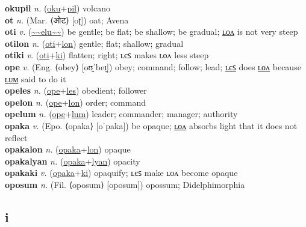\textbf{okupil} \textit{n.} (\hyperref[oku]{oku}+\hyperref[pil]{pil})
volcano \label{okupil} \\
\textbf{ot} \textit{n.} (Mar. ⟨ओट⟩ [oʈ])
oat; Avena \label{ot} \\
\textbf{oti} \textit{v.} (\hyperref[elu]{\~{}\~{}elu\~{}\~{}})
be gentle; be flat; be shallow; be gradual; \hyperref[otilon]{ʟᴏᴧ} is not very steep \label{oti} \\
\textbf{otilon} \textit{n.} (\hyperref[oti]{oti}+\hyperref[lon]{lon})
gentle; flat; shallow; gradual \label{otilon} \\
\textbf{otiki} \textit{v.} (\hyperref[oti]{oti}+\hyperref[ki]{ki})
flatten; right; ʟєꜱ makes ʟᴏᴧ less steep \label{otiki} \\
\textbf{ope} \textit{v.} (Eng. ⟨obey⟩ [oʊ̯ˈbeɪ̯])
obey; command; follow; lead; \hyperref[opeles]{ʟєꜱ} does \hyperref[opelon]{ʟᴏᴧ} because \hyperref[opelum]{ʟᴜᴍ} said to do it \label{ope} \\
\textbf{opeles} \textit{n.} (\hyperref[ope]{ope}+\hyperref[les]{les})
obedient; follower \label{opeles} \\
\textbf{opelon} \textit{n.} (\hyperref[ope]{ope}+\hyperref[lon]{lon})
order; command \label{opelon} \\
\textbf{opelum} \textit{n.} (\hyperref[ope]{ope}+\hyperref[lum]{lum})
leader; commander; manager; authority \label{opelum} \\
\textbf{opaka} \textit{v.} (Epo. ⟨opaka⟩ [oˈpaka])
be opaque; \hyperref[opakalon]{ʟᴏᴧ} absorbs light that it does not reflect \label{opaka} \\
\textbf{opakalon} \textit{n.} (\hyperref[opaka]{opaka}+\hyperref[lon]{lon})
opaque \label{opakalon} \\
\textbf{opakalyan} \textit{n.} (\hyperref[opaka]{opaka}+\hyperref[lyan]{lyan})
opacity \label{opakalyan} \\
\textbf{opakaki} \textit{v.} (\hyperref[opaka]{opaka}+\hyperref[ki]{ki})
opaquify; ʟєꜱ make ʟᴏᴧ become opaque \label{opakaki} \\
\textbf{oposum} \textit{n.} (Fil. ⟨oposum⟩ [oposum])
opossum; Didelphimorphia \label{oposum} \\
\subsection{i}

